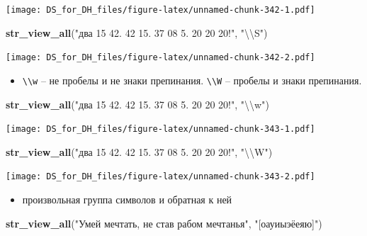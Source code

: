 \documentclass[
]{book}
\newenvironment{Shaded}{\begin{snugshade}}{\end{snugshade}}
\newcommand{\CharTok}[1]{\textcolor[rgb]{0.31,0.60,0.02}{#1}}
\newcommand{\KeywordTok}[1]{\textcolor[rgb]{0.13,0.29,0.53}{\textbf{#1}}}
\newcommand{\NormalTok}[1]{#1}
\newcommand{\StringTok}[1]{\textcolor[rgb]{0.31,0.60,0.02}{#1}}
\providecommand{\tightlist}{%
  \setlength{\itemsep}{0pt}\setlength{\parskip}{0pt}}
\begin{document}
\texttt{[image: DS\_for\_DH\_files/figure-latex/unnamed-chunk-342-1.pdf]}

\begin{Shaded}
\begin{Highlighting}[]
\KeywordTok{str_view_all}\NormalTok{(}\StringTok{"два 15 42. 42 15. 37 08 5. 20 20 20!"}\NormalTok{, }\StringTok{"}\CharTok{\textbackslash{}\textbackslash{}}\StringTok{S"}\NormalTok{)}
\end{Highlighting}
\end{Shaded}

\texttt{[image: DS\_for\_DH\_files/figure-latex/unnamed-chunk-342-2.pdf]}

\begin{itemize}
\tightlist
\item
  \texttt{\textbackslash{}\textbackslash{}w} -- не пробелы и не знаки препинания. \texttt{\textbackslash{}\textbackslash{}W} -- пробелы и знаки препинания.
\end{itemize}

\begin{Shaded}
\begin{Highlighting}[]
\KeywordTok{str_view_all}\NormalTok{(}\StringTok{"два 15 42. 42 15. 37 08 5. 20 20 20!"}\NormalTok{, }\StringTok{"}\CharTok{\textbackslash{}\textbackslash{}}\StringTok{w"}\NormalTok{)}
\end{Highlighting}
\end{Shaded}

\texttt{[image: DS\_for\_DH\_files/figure-latex/unnamed-chunk-343-1.pdf]}

\begin{Shaded}
\begin{Highlighting}[]
\KeywordTok{str_view_all}\NormalTok{(}\StringTok{"два 15 42. 42 15. 37 08 5. 20 20 20!"}\NormalTok{, }\StringTok{"}\CharTok{\textbackslash{}\textbackslash{}}\StringTok{W"}\NormalTok{)}
\end{Highlighting}
\end{Shaded}

\texttt{[image: DS\_for\_DH\_files/figure-latex/unnamed-chunk-343-2.pdf]}

\begin{itemize}
\tightlist
\item
  произвольная группа символов и обратная к ней
\end{itemize}

\begin{Shaded}
\begin{Highlighting}[]
\KeywordTok{str_view_all}\NormalTok{(}\StringTok{"Умей мечтать, не став рабом мечтанья"}\NormalTok{, }\StringTok{"[оауиыэёеяю]"}\NormalTok{)}
\end{Highlighting}
\end{Shaded}
\end{document}
